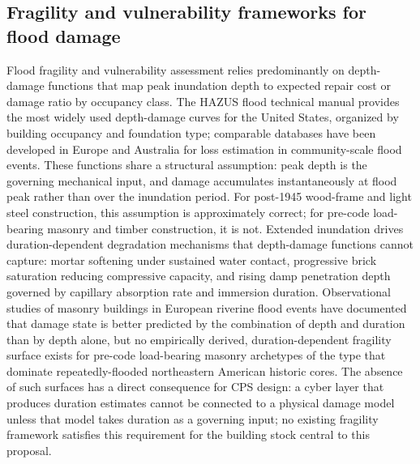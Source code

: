 \documentclass[11pt]{article}
\begin{document}
\subsection{Fragility and vulnerability frameworks for flood damage}
Flood fragility and vulnerability assessment relies predominantly on depth-damage
functions that map peak inundation depth to expected repair cost or damage ratio
by occupancy class.
The HAZUS flood technical manual provides the most widely used depth-damage curves
for the United States, organized by building occupancy and foundation type;
comparable databases have been developed in Europe and Australia for loss estimation
in community-scale flood events.
These functions share a structural assumption: peak depth is the governing mechanical
input, and damage accumulates instantaneously at flood peak rather than over the
inundation period.
For post-1945 wood-frame and light steel construction, this assumption is
approximately correct; for pre-code load-bearing masonry and timber construction,
it is not.
Extended inundation drives duration-dependent degradation mechanisms that
depth-damage functions cannot capture: mortar softening under sustained water
contact, progressive brick saturation reducing compressive capacity, and rising
damp penetration depth governed by capillary absorption rate and immersion duration.
Observational studies of masonry buildings in European riverine flood events have
documented that damage state is better predicted by the combination of depth and
duration than by depth alone, but no empirically derived, duration-dependent
fragility surface exists for pre-code load-bearing masonry archetypes of the type
that dominate repeatedly-flooded northeastern American historic cores.
The absence of such surfaces has a direct consequence for CPS design: a cyber layer
that produces duration estimates cannot be connected to a physical damage model
unless that model takes duration as a governing input; no existing fragility
framework satisfies this requirement for the building stock central to this
proposal.
\end{document}
